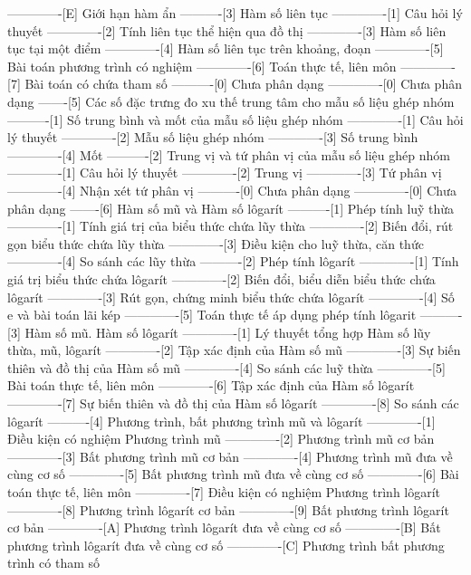 -------------[E] Giới hạn hàm ẩn
----------[3] Hàm số liên tục
-------------[1] Câu hỏi lý thuyết
-------------[2] Tính liên tục thể hiện qua đồ thị
-------------[3] Hàm số liên tục tại một điểm
-------------[4] Hàm số liên tục trên khoảng, đoạn
-------------[5] Bài toán phương trình có nghiệm
-------------[6] Toán thực tế, liên môn
-------------[7] Bài toán có chứa tham số
----------[0] Chưa phân dạng
-------------[0] Chưa phân dạng
-------[5] Các số đặc trưng đo xu thế trung tâm cho mẫu số liệu ghép nhóm
----------[1] Số trung bình và mốt của mẫu số liệu ghép nhóm
-------------[1] Câu hỏi lý thuyết
-------------[2] Mẫu số liệu ghép nhóm
-------------[3] Số trung bình
-------------[4] Mốt
----------[2] Trung vị và tứ phân vị của mẫu số liệu ghép nhóm
-------------[1] Câu hỏi lý thuyết
-------------[2] Trung vị
-------------[3] Tứ phân vị
-------------[4] Nhận xét tứ phân vị
----------[0] Chưa phân dạng
-------------[0] Chưa phân dạng
-------[6] Hàm số mũ và Hàm số lôgarít
----------[1] Phép tính luỹ thừa
-------------[1] Tính giá trị của biểu thức chứa lũy thừa
-------------[2] Biến đổi, rút gọn biểu thức chứa lũy thừa
-------------[3] Điều kiện cho luỹ thừa, căn thức
-------------[4] So sánh các lũy thừa
----------[2] Phép tính lôgarít
-------------[1] Tính giá trị biểu thức chứa lôgarít
-------------[2] Biến đổi, biểu diễn biểu thức chứa lôgarít
-------------[3] Rút gọn, chứng minh biểu thức chứa lôgarít
-------------[4] Số e và bài toán lãi kép
-------------[5] Toán thực tế áp dụng phép tính lôgarit
----------[3] Hàm số mũ. Hàm số lôgarít
-------------[1] Lý thuyết tổng hợp Hàm số lũy thừa, mũ, lôgarít
-------------[2] Tập xác định của Hàm số mũ
-------------[3] Sự biến thiên và đồ thị của Hàm số mũ
-------------[4] So sánh các luỹ thừa
-------------[5] Bài toán thực tế, liên môn
-------------[6] Tập xác định của Hàm số lôgarít
-------------[7] Sự biến thiên và đồ thị của Hàm số lôgarít
-------------[8] So sánh các lôgarít
----------[4] Phương trình, bất phương trình mũ và lôgarít
-------------[1] Điều kiện có nghiệm Phương trình mũ
-------------[2] Phương trình mũ cơ bản
-------------[3] Bất phương trình mũ cơ bản
-------------[4] Phương trình mũ đưa về cùng cơ số
-------------[5] Bất phương trình mũ đưa về cùng cơ số
-------------[6] Bài toán thực tế, liên môn
-------------[7] Điều kiện có nghiệm Phương trình lôgarít
-------------[8] Phương trình lôgarít cơ bản
-------------[9] Bất phương trình lôgarít cơ bản
-------------[A] Phương trình lôgarít đưa về cùng cơ số
-------------[B] Bất phương trình lôgarít đưa về cùng cơ số
-------------[C] Phương trình bất phương trình có tham số
